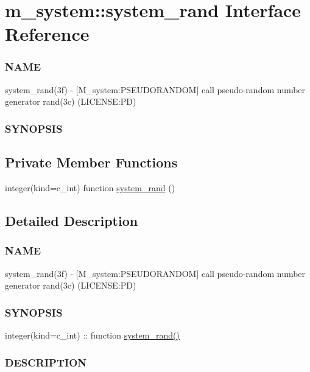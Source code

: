 \hypertarget{interfacem__system_1_1system__rand}{}\section{m\+\_\+system\+:\+:system\+\_\+rand Interface Reference}
\label{interfacem__system_1_1system__rand}


\subsubsection*{N\+A\+ME}

system\+\_\+rand(3f) -\/ \mbox{[}M\+\_\+system\+:P\+S\+E\+U\+D\+O\+R\+A\+N\+D\+OM\mbox{]} call pseudo-\/random number generator rand(3c) (L\+I\+C\+E\+N\+SE\+:PD) \subsubsection*{S\+Y\+N\+O\+P\+S\+IS} 


\subsection*{Private Member Functions}
\begin{DoxyCompactItemize}
\item 
integer(kind=c\+\_\+int) function \mbox{\hyperlink{interfacem__system_1_1system__rand_a35d3d17489a09dede93091bdc4ab69e0}{system\+\_\+rand}} ()
\end{DoxyCompactItemize}


\subsection{Detailed Description}
\subsubsection*{N\+A\+ME}

system\+\_\+rand(3f) -\/ \mbox{[}M\+\_\+system\+:P\+S\+E\+U\+D\+O\+R\+A\+N\+D\+OM\mbox{]} call pseudo-\/random number generator rand(3c) (L\+I\+C\+E\+N\+SE\+:PD) \subsubsection*{S\+Y\+N\+O\+P\+S\+IS}

integer(kind=c\+\_\+int) \+:\+: function \mbox{\hyperlink{interfacem__system_1_1system__rand_a35d3d17489a09dede93091bdc4ab69e0}{system\+\_\+rand()}} \subsubsection*{D\+E\+S\+C\+R\+I\+P\+T\+I\+ON}

